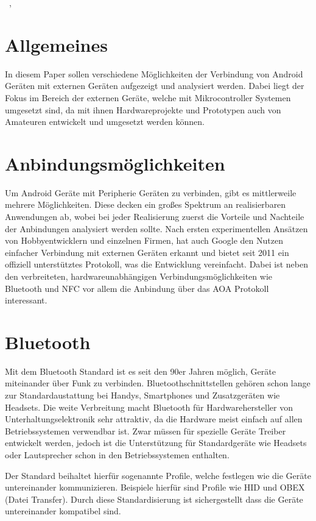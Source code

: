 \documentclass[12pt,journal,compsoc]{IEEEtran}
\begin{document}
\hfill{\the\day~\Monat, \the\year  }

\section{Allgemeines}
In diesem Paper sollen verschiedene Möglichkeiten der Verbindung von Android Geräten mit externen Geräten aufgezeigt und analysiert werden.
Dabei liegt der Fokus im Bereich der externen Geräte, welche mit Mikrocontroller Systemen umgesetzt sind, da mit ihnen Hardwareprojekte und Prototypen auch von Amateuren entwickelt und umgesetzt werden können.

\section{Anbindungsmöglichkeiten}
Um Android Geräte mit Peripherie Geräten zu verbinden, gibt es mittlerweile mehrere Möglichkeiten.
Diese decken ein großes Spektrum an realisierbaren Anwendungen ab, wobei bei jeder Realisierung zuerst die Vorteile und Nachteile der Anbindungen analysiert werden sollte.
Nach ersten experimentellen Ansätzen von Hobbyentwicklern und einzelnen Firmen, hat auch Google den Nutzen einfacher Verbindung mit externen Geräten 
erkannt und bietet seit 2011 ein offiziell unterstütztes Protokoll, was die Entwicklung vereinfacht.
Dabei ist neben den verbreiteten, hardwareunabhängigen Verbindungsmöglichkeiten wie Bluetooth und NFC vor allem die Anbindung über das AOA Protokoll interessant. 

\section{Bluetooth}
Mit dem Bluetooth Standard ist es seit den 90er Jahren möglich, Geräte miteinander über Funk zu verbinden. Bluetoothschnittstellen gehören schon lange zur Standardaustattung bei Handys, Smartphones und Zusatzgeräten wie Headsets.
Die weite Verbreitung macht Bluetooth für Hardwarehersteller von Unterhaltungselektronik sehr attraktiv, da die Hardware meist einfach auf allen Betriebssystemen verwendbar ist.
Zwar müssen für spezielle Geräte Treiber entwickelt werden, jedoch ist die Unterstützung für Standardgeräte wie Headsets oder Lautsprecher schon in den Betriebssystemen enthalten.

Der Standard beihaltet hierfür sogenannte Profile, welche festlegen wie die Geräte untereinander kommunizieren.
Beispiele hierfür sind Profile wie HID und OBEX (Datei Transfer). 
Durch diese Standardisierung ist sichergestellt dass die Geräte untereinander kompatibel sind.
\cite{bluetooth}
\end{document}
